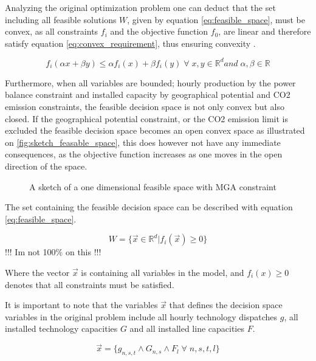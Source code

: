 Analyzing the original optimization problem one can deduct that the set including all feasible solutions $W$, given by equation \ref{eq:feasible_space}, must be convex, as all constraints $f_i$ and the objective function $f_0$, are linear and therefore satisfy equation \vref{eq:convex_requirement}, thus ensuring convexity \cite{ConvexOpimization}. 

\begin{equation}\label{eq:convex_requirement}
f_i(\alpha x + \beta y) \leq \alpha f_i(x) + \beta f_i(y) \; \forall \; x, y \in \mathbb{R}^d and  \; \alpha, \beta \in \mathbb{R}
\end{equation}

Furthermore, when all variables are bounded; hourly production by the power balance constraint and installed capacity by geographical potential and CO2 emission constraints, the feasible decision space is not only convex but also closed. If the geographical potential constraint, or the CO2 emission limit is excluded the feasible decision space becomes an open convex space as illustrated on \vref{fig:sketch_feasable_space}, this does however not have any immediate consequences, as the objective function increases as one moves in the open direction of the space. 

\begin{figure}[ht]
	\centering
	\caption{A sketch of a one dimensional feasible space with MGA constraint }
	\label{fig:sketch_feasable_space}
\end{figure}

The set containing the feasible decision space can be described with equation \ref{eq:feasible_space}. 

\begin{equation}\label{eq:feasible_space}
W = \{ \vec{x}\in \mathbb{R}^d | f_i(\vec{x}) \geq 0 \}
\end{equation}
!!! Im not 100\% on this !!! 

Where the vector $\vec{x}$ is containing all variables in the model, and $ f_i(x) \geq 0 $ denotes that all constraints must be satisfied. 

It is important to note that the variables $\vec{x}$ that defines the decision space variables in the original problem include all hourly technology dispatches $g$, all installed technology capacities $G$ and all installed line capacities $F$. 

\begin{equation}
\vec{x} = \{g_{n,s,t} \wedge G_{n,s} \wedge F_l \; \forall \; n,s,t,l \}
\end{equation}


